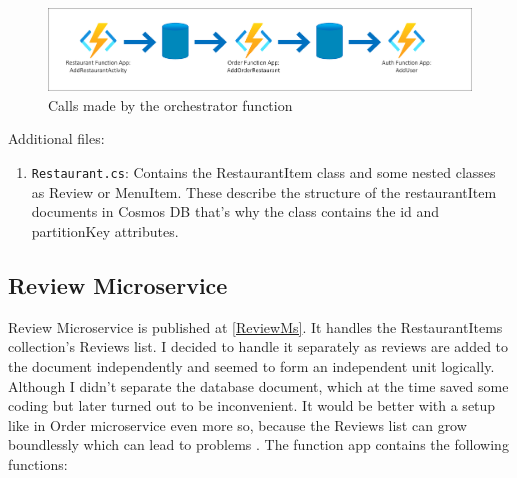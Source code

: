 \begin{enumerate}
	\begin{figure}[!ht]
		\centering
		\includegraphics[width=150mm, keepaspectratio]{figures/Durable}
		\caption{Calls made by the orchestrator function} 
		\label{fig:durable}
	\end{figure}
	
\end{enumerate}

Additional files: 

\begin{enumerate}
	\item \verb+Restaurant.cs+: Contains the RestaurantItem class and some nested classes as Review or MenuItem. These describe the structure of the restaurantItem documents in Cosmos DB that's why the class contains the id and partitionKey attributes.
\end{enumerate}

\subsection{Review Microservice}\label{ReviewMicroservice}

Review Microservice is published at \ref{ReviewMs}. It handles the RestaurantItems collection's Reviews list. I decided to handle it separately as reviews are added to the document independently and seemed to form an independent unit logically. Although I didn't separate the database document, which at the time saved some coding but later turned out to be inconvenient. It would be better with a setup like in Order microservice even more so, because the Reviews list can grow boundlessly which can lead to problems \cite{NoSQLArrays}. The function app contains the following functions:

